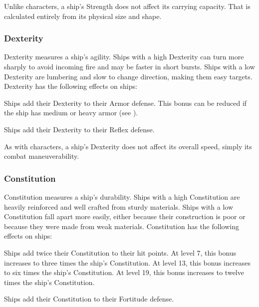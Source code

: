      Unlike characters, a ship's Strength does not affect its carrying capacity.
      That is calculated entirely from its physical size and shape.

    \subsubsection{Dexterity}
      Dexterity measures a ship's agility.
      Ships with a high Dexterity can turn more sharply to avoid incoming fire and may be faster in short bursts.
      Ships with a low Dexterity are lumbering and slow to change direction, making them easy targets.
      Dexterity has the following effects on ships:
      \begin{raggeditemize}
        \item Ships add their Dexterity to their Armor defense.
          This bonus can be reduced if the ship has medium or heavy armor (see ).
        \item Ships add their Dexterity to their Reflex defense.
      \end{raggeditemize}

      As with characters, a ship's Dexterity does not affect its overall speed, simply its combat maneuverability.

    \subsubsection{Constitution}
      Constitution measures a ship's durability.
      Ships with a high Constitution are heavily reinforced and well crafted from sturdy materials.
      Ships with a low Constitution fall apart more easily, either because their construction is poor or because they were made from weak materials.
      Constitution has the following effects on ships:
      \begin{raggeditemize}
        \item Ships add twice their Constitution to their hit points.
          At level 7, this bonus increases to three times the ship's Constitution.
          At level 13, this bonus increases to six times the ship's Constitution.
          At level 19, this bonus increases to twelve times the ship's Constitution.
        \item Ships add their Constitution to their Fortitude defense.
      \end{raggeditemize}

